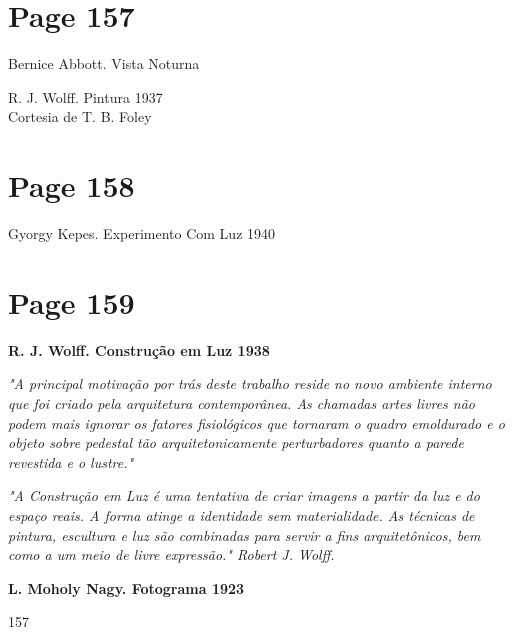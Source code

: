 \documentclass[a4paper]{article}
\begin{document}
\vspace*{\fill}

\newpage
\section*{Page 157}

\vspace*{9cm} %

\raggedright
Bernice Abbott. Vista Noturna

\vspace*{3cm} %

\raggedright
R. J. Wolff. Pintura 1937\\
Cortesia de T. B. Foley

\vfill %


\newpage
\section*{Page 158}

Gyorgy Kepes. Experimento Com Luz 1940

\newpage
\section*{Page 159}

\textbf{R. J. Wolff. Construção em Luz 1938}

\textit{"A principal motivação por trás deste trabalho reside no novo ambiente interno que foi criado pela arquitetura contemporânea. As chamadas artes livres não podem mais ignorar os fatores fisiológicos que tornaram o quadro emoldurado e o objeto sobre pedestal tão arquitetonicamente perturbadores quanto a parede revestida e o lustre."}

\textit{"A Construção em Luz é uma tentativa de criar imagens a partir da luz e do espaço reais. A forma atinge a identidade sem materialidade. As técnicas de pintura, escultura e luz são combinadas para servir a fins arquitetônicos, bem como a um meio de livre expressão." Robert J. Wolff.}

\textbf{L. Moholy Nagy. Fotograma 1923}

157

\newpage
\end{document}
